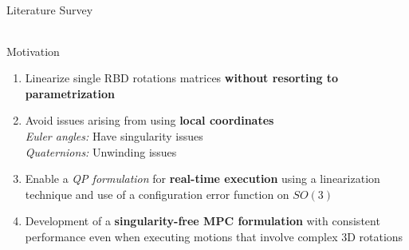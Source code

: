 \documentclass{beamer}
\begin{document}
\begin{frame}{Literature Survey}
\begin{table}[ht]
{\begin{tabular}{|>{\centering\arraybackslash}p{2.5cm}|>{\centering\arraybackslash}p{3.0cm}|>{\centering\arraybackslash}p{3.5cm}|>{\centering\arraybackslash}p{5.0cm}|}
				\hline
			\end{tabular}
		}
	\end{table}
\end{frame}



\begin{frame}{Motivation}
	\begin{enumerate}
		\item Linearize single RBD rotations matrices \textbf{without resorting to parametrization}
		\item Avoid issues arising from using \textbf{local coordinates}\\
		      \textit{Euler angles:} Have singularity issues\\
		      \textit{Quaternions:} Unwinding issues
		\item Enable a \textit{QP formulation} for \textbf{real-time execution} using a linearization  technique and use of a configuration error function on $SO(3)$
		\item Development of a \textbf{singularity-free MPC formulation} with consistent performance even when executing motions that involve complex 3D rotations
	\end{enumerate}
\end{frame}
\end{document}
